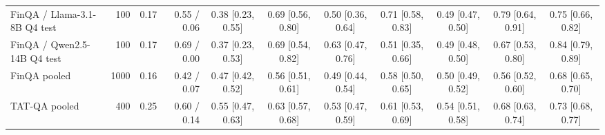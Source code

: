 \begin{tabular}{@{}l r r r ccccccc@{}}
FinQA / Llama-3.1-8B Q4 test & 100 & 0.17 & 0.55 / 0.06 & 0.38 \small[0.23, 0.55] & 0.69 \small[0.56, 0.80] & 0.50 \small[0.36, 0.64] & 0.71 \small[0.58, 0.83] & 0.49 \small[0.47, 0.50] & 0.79 \small[0.64, 0.91] & 0.75 \small[0.66, 0.82] \\
FinQA / Qwen2.5-14B Q4 test & 100 & 0.17 & 0.69 / 0.00 & 0.37 \small[0.23, 0.53] & 0.69 \small[0.54, 0.82] & 0.63 \small[0.47, 0.76] & 0.51 \small[0.35, 0.66] & 0.49 \small[0.48, 0.50] & 0.67 \small[0.53, 0.80] & 0.84 \small[0.79, 0.89] \\
\midrule
FinQA pooled & 1000 & 0.16 & 0.42 / 0.07 & 0.47 \small[0.42, 0.52] & 0.56 \small[0.51, 0.61] & 0.49 \small[0.44, 0.54] & 0.58 \small[0.50, 0.65] & 0.50 \small[0.49, 0.52] & 0.56 \small[0.52, 0.60] & 0.68 \small[0.65, 0.70] \\
\midrule
TAT-QA pooled & 400 & 0.25 & 0.60 / 0.14 & 0.55 \small[0.47, 0.63] & 0.63 \small[0.57, 0.68] & 0.53 \small[0.47, 0.59] & 0.61 \small[0.53, 0.69] & 0.54 \small[0.51, 0.58] & 0.68 \small[0.63, 0.74] & 0.73 \small[0.68, 0.77] \\
\bottomrule
\end{tabular}